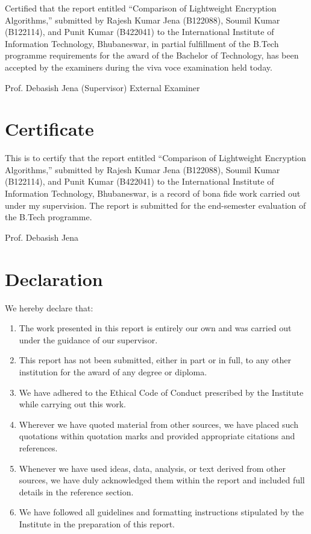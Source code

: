 \documentclass[12pt]{report}
\begin{document}
\vspace{1cm}

\noindent Certified that the report entitled ``Comparison of Lightweight Encryption Algorithms,''
submitted by Rajesh Kumar Jena (B122088), Soumil Kumar (B122114), and Punit Kumar (B422041)
to the International Institute of Information Technology, Bhubaneswar, in partial fulfillment
of the B.Tech programme requirements for the award of the Bachelor of Technology, has been accepted by the examiners during the viva voce examination held today.

\vfill

\noindent \underline{\hspace{5.5cm}} \hfill \underline{\hspace{5.5cm}}

\noindent Prof. Debasish Jena (Supervisor) \hfill External Examiner

\newpage
\chapter*{Certificate}

This is to certify that the report entitled ``Comparison of Lightweight Encryption Algorithms,''
submitted by Rajesh Kumar Jena (B122088), Soumil Kumar (B122114), and Punit Kumar (B422041)
to the International Institute of Information Technology, Bhubaneswar, is a record of bona fide
work carried out under my supervision. The report is submitted for the end-semester evaluation
of the B.Tech programme.

\vfill
\noindent Prof. Debasish Jena

\newpage
\chapter*{Declaration}

We hereby declare that:

\begin{enumerate}
    \item The work presented in this report is entirely our own and was carried out under the guidance of our supervisor.
    \item This report has not been submitted, either in part or in full, to any other institution for the award of any degree or diploma.
    \item We have adhered to the Ethical Code of Conduct prescribed by the Institute while carrying out this work.
    \item Wherever we have quoted material from other sources, we have placed such quotations within quotation marks and provided appropriate citations and references.
    \item Whenever we have used ideas, data, analysis, or text derived from other sources, we have duly acknowledged them within the report and included full details in the reference section.
    \item We have followed all guidelines and formatting instructions stipulated by the Institute in the preparation of this report.
\end{enumerate}
\end{document}
